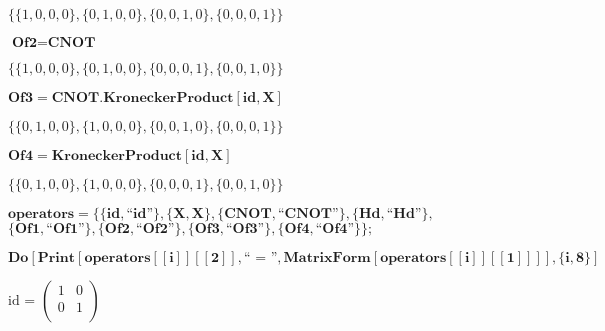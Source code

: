 \begin{doublespace}
\noindent\(\{\{1,0,0,0\},\{0,1,0,0\},\{0,0,1,0\},\{0,0,0,1\}\}\)
\end{doublespace}

\begin{doublespace}
\noindent\(\pmb{\text{Of2} = \text{CNOT}}\)
\end{doublespace}

\begin{doublespace}
\noindent\(\{\{1,0,0,0\},\{0,1,0,0\},\{0,0,0,1\},\{0,0,1,0\}\}\)
\end{doublespace}

\begin{doublespace}
\noindent\(\pmb{\text{Of3} = \text{CNOT}.\text{KroneckerProduct}[\text{id}, X]}\)
\end{doublespace}

\begin{doublespace}
\noindent\(\{\{0,1,0,0\},\{1,0,0,0\},\{0,0,1,0\},\{0,0,0,1\}\}\)
\end{doublespace}

\begin{doublespace}
\noindent\(\pmb{\text{Of4} = \text{KroneckerProduct}[\text{id}, X]}\)
\end{doublespace}

\begin{doublespace}
\noindent\(\{\{0,1,0,0\},\{1,0,0,0\},\{0,0,0,1\},\{0,0,1,0\}\}\)
\end{doublespace}

\begin{doublespace}
\noindent\(\pmb{\text{operators} = \{\{\text{id}, \text{{``}id{''}}\}, \{X, \text{X}\}, \{\text{CNOT}, \text{{``}CNOT{''}}\}, \{\text{Hd}, \text{{``}Hd{''}}\},}\)\\
\noindent\(\pmb{\{\text{Of1}, \text{{``}Of1{''}}\}, \{\text{Of2}, \text{{``}Of2{''}}\}, \{\text{Of3}, \text{{``}Of3{''}}\}, \{\text{Of4}, \text{{``}Of4{''}}\}\};}\)
\end{doublespace}

\begin{doublespace}
\noindent\(\pmb{\text{Do}[\text{Print}[\text{operators}[[i]][[2]], \text{{``} = {''}}, \text{MatrixForm}[\text{operators}[[i]][[1]]]], \{i, 8\}]}\)
\end{doublespace}

\noindent\(\text{id}\text{ = }\left(
\begin{array}{cc}
 1 & 0 \\
 0 & 1 \\
\end{array}
\right)\)

